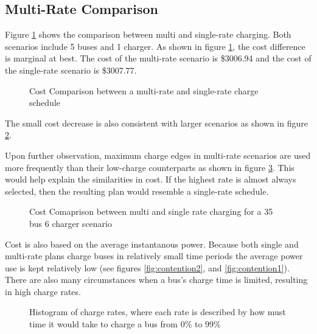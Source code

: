 \subsection{Multi-Rate Comparison}
Figure \ref{fig:multiRateCostComparison} shows the comparison between multi and single-rate charging. Both scenarios include 5 buses and 1 charger. As shown in figure \ref{fig:multiRateCostComparison}, the cost difference is marginal at best.  The cost of the multi-rate scenario is \$3006.94 and the cost of the single-rate scenario is \$3007.77. 
\begin{figure}
	\centering
	\caption{Cost Comparison between a multi-rate and single-rate charge schedule}
	\label{fig:multiRateCostComparison}
\end{figure}
The small cost decrease is also consistent with larger scenarios as shown in figure \ref{fig:costComparisonMultiVsSingleLarge}. 
\par Upon further observation, maximum charge edges in multi-rate scenarios are used more frequently than their low-charge counterparts as shown in figure \ref{fig:chargeRateHistogram}. This would help explain the similarities in cost. If the highest rate is almost always selected, then the resulting plan would resemble a single-rate schedule.  
\begin{figure}
	\caption{Cost Comaprison between multi and single rate charging for a 35 bus 6 charger scenario}
	\label{fig:costComparisonMultiVsSingleLarge}
\end{figure}
\par Cost is also based on the average instantanous power. Because both single and multi-rate plans charge buses in relatively small time periods the average power use is kept relatively low (see figures \ref{fig:contention2}, and \ref{fig:contention1}). There are also many circumstances when a bus's charge time is limited, resulting in high charge rates.
\begin{figure}
	\caption{Histogram of charge rates, where each rate is described by how must time it would take to charge a bus from 0\% to 99\%}
	\label{fig:chargeRateHistogram}
\end{figure}













